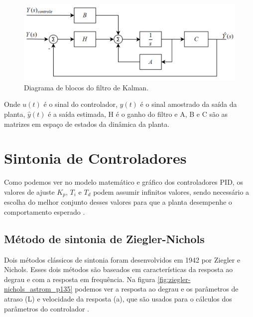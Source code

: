 \begin{figure}[H]
  \caption{Diagrama de blocos do filtro de Kalman.}
  \begin{center}
      \includegraphics[scale=0.5]{referencial/img/kalman_levine_p591}
  \end{center}
  \label{fig:kalman_levine_p591}
\end{figure}

Onde $u(t)$ é o sinal do controlador, $y(t)$ é o sinal amostrado da saída da planta, $\hat {y}(t) $ é a saída estimada, H é o ganho do filtro e A, B e C são as matrizes em espaço de estados da dinâmica da planta.



\section{Sintonia de Controladores}

Como podemos ver no modelo matemático e gráfico dos controladores PID, os valores de ajuste $K_p$, $T_i$ e $T_d$  podem assumir infinitos valores, sendo necessário a escolha do melhor conjunto desses valores para que a planta desempenhe o comportamento esperado \cite{Ogata}.



\subsection{Método de sintonia de Ziegler-Nichols}

Dois métodos clássicos de sintonia foram desenvolvidos em 1942 por Ziegler e Nichols. Esses dois métodos são baseados em características da resposta ao degrau e com a resposta em frequência. Na figura \ref{fig:ziegler-nichols_astrom_p135} podemos ver a resposta ao degrau e os parâmetros de atraso (L) e velocidade da resposta (a), que são usados para o cálculos dos parâmetros do controlador  \cite{Astrom1995}. 

